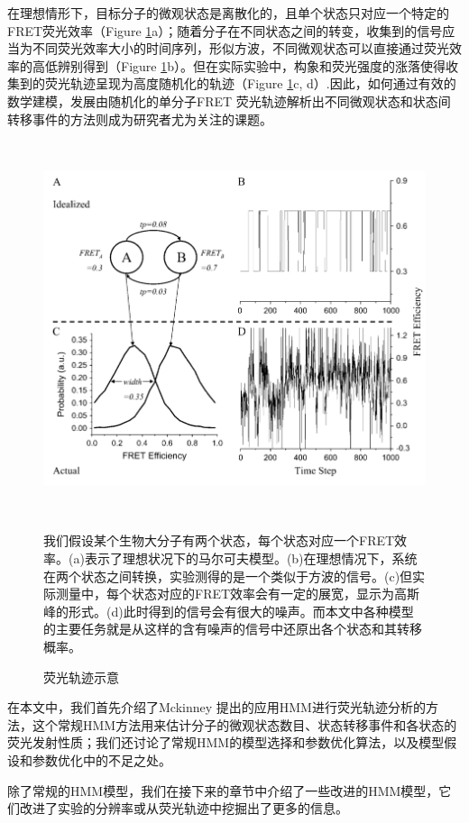 \documentclass[11pt, a4paper]{article}
\begin{document}
在理想情形下，目标分子的微观状态是离散化的，且单个状态只对应一个特定的FRET荧光效率（Figure \ref{fig:trace}a）；随着分子在不同状态之间的转变，收集到的信号应当为不同荧光效率大小的时间序列，形似方波，不同微观状态可以直接通过荧光效率的高低辨别得到（Figure \ref{fig:trace}b）。但在实际实验中，构象和荧光强度的涨落使得收集到的荧光轨迹呈现为高度随机化的轨迹（Figure \ref{fig:trace}c, d）.因此，如何通过有效的数学建模，发展由随机化的单分子FRET 荧光轨迹解析出不同微观状态和状态间转移事件的方法则成为研究者尤为关注的课题。
\begin{figure}[htb]
  \centering
  \includegraphics[height=11cm]{Fig_trace.PNG}\\
  \caption{荧光轨迹示意}\label{fig:trace}
  \small \flushleft
  我们假设某个生物大分子有两个状态，每个状态对应一个FRET效率。(a)表示了理想状况下的马尔可夫模型。(b)在理想情况下，系统在两个状态之间转换，实验测得的是一个类似于方波的信号。(c)但实际测量中，每个状态对应的FRET效率会有一定的展宽，显示为高斯峰的形式。(d)此时得到的信号会有很大的噪声。而本文中各种模型的主要任务就是从这样的含有噪声的信号中还原出各个状态和其转移概率。
\end{figure}

在本文中，我们首先介绍了Mckinney 提出的应用HMM进行荧光轨迹分析的方法，这个常规HMM方法用来估计分子的微观状态数目、状态转移事件和各状态的荧光发射性质；我们还讨论了常规HMM的模型选择和参数优化算法，以及模型假设和参数优化中的不足之处。

除了常规的HMM模型，我们在接下来的章节中介绍了一些改进的HMM模型，它们改进了实验的分辨率或从荧光轨迹中挖掘出了更多的信息。
\end{document}
